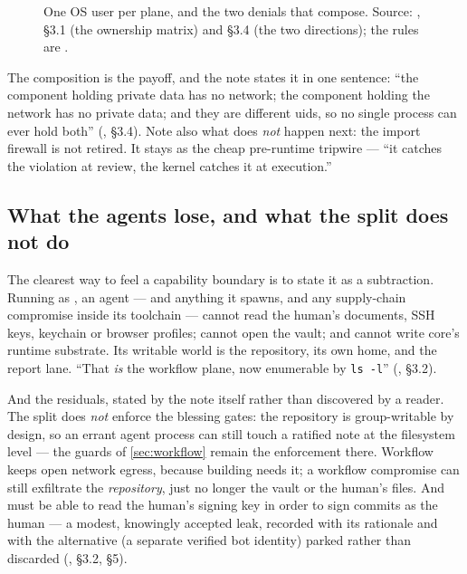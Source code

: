 \begin{figure}[t]
  \centering
  
  \caption[The four plane principals]{One OS user per plane, and the two denials
    that compose. Source: , \S 3.1 (the ownership
    matrix) and \S 3.4 (the two directions); the rules are
    .}
  \label{fig:planes}
\end{figure}

The composition is the payoff, and the note states it in one sentence: ``the
component holding private data has no network; the component holding the network
has no private data; and they are different uids, so no single process can ever
hold both'' (, \S 3.4). Note also what does
\emph{not} happen next: the import firewall is not retired. It stays as the cheap
pre-runtime tripwire --- ``it catches the violation at review, the kernel catches
it at execution.''

\subsection*{What the agents lose, and what the split does not do}

The clearest way to feel a capability boundary is to state it as a subtraction.
Running as \pwork{}, an agent --- and anything it spawns, and any supply-chain
compromise inside its toolchain --- cannot read the human's documents, SSH keys,
keychain or browser profiles; cannot open the vault; and cannot write core's
runtime substrate. Its writable world is the repository, its own home, and the
report lane. ``That \emph{is} the workflow plane, now enumerable by \texttt{ls
-l}'' (, \S 3.2).

And the residuals, stated by the note itself rather than discovered by a reader.
The split does \emph{not} enforce the blessing gates: the repository is
group-writable by design, so an errant agent process can still touch a ratified
note at the filesystem level --- the guards of \autoref{sec:workflow} remain the
enforcement there. Workflow keeps open network egress, because building needs it;
a workflow compromise can still exfiltrate the \emph{repository}, just no longer
the vault or the human's files. And \pwork{} must be able to read the human's
signing key in order to sign commits as the human --- a modest, knowingly accepted
leak, recorded with its rationale and with the alternative (a separate verified bot
identity) parked rather than discarded (, \S 3.2,
\S 5).

